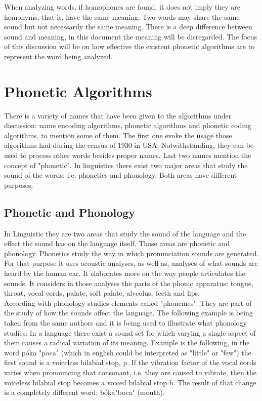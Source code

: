 \documentclass[9pt,conference]{IEEEtran}
\begin{document}
When analyzing words, if homophones are found, it does not imply they are 
homonyms, that is, have the same meaning. Two words may  share the same 
sound but not necessarily the same meaning. There is a deep difference between 
sound and meaning, in this document the meaning will be disregarded. The focus of 
this discussion will be on how effective the existent phonetic algorithms are to 
represent the word being analyzed.\\
 
 
 

\section{Phonetic Algorithms}
There is a variety of names that have been given to the algorithms under discussion: 
name encoding algorithms\cite{ref:17}, phonetic algorithms\cite{ref:01} and phonetic 
coding algorithms\cite{ref:10}, to mention some of them. The first one evoke the usage 
those algorithms had during the census of 1930 in USA. Notwithstanding, they can be 
used to process other words besides proper names. Last two names mention the concept of 
"phonetic". In linguistics there exist two major areas that study the sound of the words: 
i.e. phonetics and phonology. Both areas have different purposes\cite{ref:31}.

\subsection{Phonetic and Phonology}
In Linguistic they are two areas that study the sound of the language and the effect the 
sound has on the language itself. Those areas are phonetic and phonology\cite{ref:03}. 
Phonetics study the way in which pronunciation sounds are generated. For that purpose 
it uses acoustic analyses, as well as, analyses of what sounds are heard by the
human ear. It elaborates more on the way people articulates the sounds. It considers in those 
analyses the parts of the phonic apparatus: tongue, throat, vocal cords, palate, soft palate, 
alveolus, teeth and lips\cite{ref:06,ref:07,ref:18}.\\

According with\cite{ref:31} phonology studies elements called "phonemes". They are part of
the study of how the sounds affect the language. The following example is being taken from 
the same authors and it is being used to illustrate what phonology studies: 
In a language there exist a sound set for which varying a single aspect of them causes a
radical variation of its meaning. Example is the following, in the word \lbrack p{\'o}ka\rbrack
"poca" (which in english could be interpreted as "little" or "few") the first sound is a voiceless 
bilabial stop, \lbrack p\rbrack. If the vibration factor of the vocal cords varies when pronouncing
that consonant, i.e. they are caused to vibrate, then the voiceless bilabial stop becomes a 
voiced bilabial stop \lbrack b\rbrack. The result of that change is a completely different word: 
\lbrack b{\'o}ka\rbrack "boca" (mouth).\\
\end{document}
